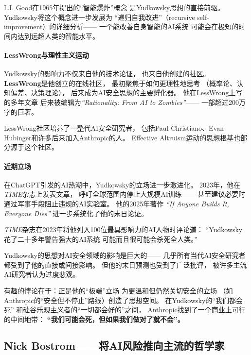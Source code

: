 I.J. Good在1965年提出的``智能爆炸''概念
是Yudkowsky思想的直接前驱。
Yudkowsky将这个概念进一步发展为
``递归自我改进''（recursive self-improvement）的详细分析——
一个能改善自身智能的AI系统
可能会在极短的时间内达到远超人类的智能水平。

\paragraph{LessWrong与理性主义运动}
Yudkowsky的影响力不仅来自他的技术论证，
也来自他创建的社区。
\textbf{LessWrong}是他创立的在线社区，
最初聚焦于如何更理性地思考
（概率论、认知偏差、决策理论），
后来成为AI安全思想的主要孵化器。
他在LessWrong上写的多年文章
后来被编辑为\textit{``Rationality: From AI to Zombies''}——
一部超过200万字的巨著。

LessWrong社区培养了一整代AI安全研究者，
包括Paul Christiano、Evan Hubinger和许多后来加入Anthropic的人。
Effective Altruism运动的思想根基也部分源于这个社区。

\paragraph{近期立场}
在ChatGPT引发的AI热潮中，Yudkowsky的立场进一步激进化。
2023年，他在\textit{TIME}杂志上发表文章，
呼吁全球范围内停止大规模AI训练——
甚至建议必要时通过军事手段阻止违规的AI实验室。
他的2025年著作
\textit{``If Anyone Builds It, Everyone Dies''}
进一步系统化了他的末日论证。

\textit{TIME}杂志在2023年将他列入100位最具影响力的AI人物时评论道：
``Yudkowsky花了二十多年警告强大的AI系统
可能而且很可能会杀死全人类。''

\begin{warnbox}[Yudkowsky的悖论]
Yudkowsky的思想对AI安全领域的影响是巨大的——
几乎所有当代AI安全研究者都受到了他的直接或间接影响。
但他的末日预测也受到了广泛批评，
被许多主流AI研究者认为过度悲观。

有趣的悖论在于：正是他的``极端''立场
为更温和但仍然关切安全的立场
（如Anthropic的``安全但不停止''路线）创造了思想空间。
在Yudkowsky的``我们都会死''
和硅谷乐观主义者的``一切都会好的''之间，
Anthropic找到了一个商业上可行的中间地带：
\textbf{``我们可能会死，但如果我们做对了就不会''。}
\end{warnbox}

\subsection{Nick Bostrom——将AI风险推向主流的哲学家}
\label{subsec:bostrom}

